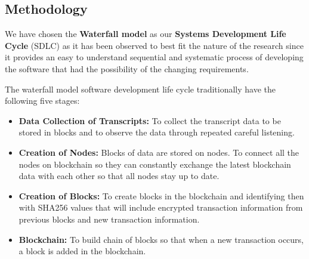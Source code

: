 \subsection{Methodology}

We have chosen the \textbf{Waterfall model} as our \textbf{Systems Development Life Cycle} (SDLC) as it has been observed to best fit the nature of the research since it provides an easy to understand sequential and systematic process of developing the software that had the possibility of the changing requirements.

The waterfall model software development life cycle traditionally have the following five stages:
\begin{itemize}
    \item \textbf{Data Collection of Transcripts:} To collect the transcript data to be stored in blocks and to observe the data through repeated careful listening.
    \item \textbf{Creation of Nodes:} Blocks of data are stored on nodes. To connect all the nodes on blockchain so they can constantly exchange the latest blockchain data with each other so that all nodes stay up to date.
    \item \textbf{Creation of Blocks:} To create blocks in the blockchain and identifying then with SHA256 values that will include encrypted transaction information from previous blocks and new transaction information.
    \item \textbf{Blockchain:} To build chain of blocks so that when a new transaction occurs, a block is added in the blockchain.
\end{itemize}

